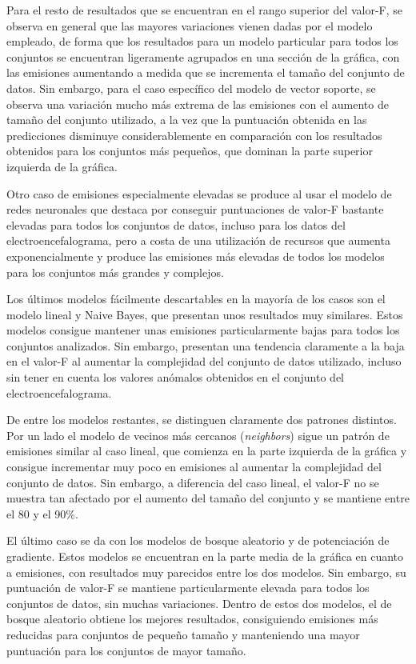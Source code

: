 Para el resto de resultados que se encuentran en el rango superior del valor-F, se observa en general que las mayores variaciones vienen dadas por el modelo empleado, de forma que los resultados para un modelo particular para todos los conjuntos se encuentran ligeramente agrupados en una sección de la gráfica, con las emisiones aumentando a medida que se incrementa el tamaño del conjunto de datos. Sin embargo, para el caso específico del modelo de vector soporte, se observa una variación mucho más extrema de las emisiones con el aumento de tamaño del conjunto utilizado, a la vez que la puntuación obtenida en las predicciones disminuye considerablemente en comparación con los resultados obtenidos para los conjuntos más pequeños, que dominan la parte superior izquierda de la gráfica.

Otro caso de emisiones especialmente elevadas se produce al usar el modelo de redes neuronales que destaca por conseguir puntuaciones de valor-F bastante elevadas para todos los conjuntos de datos, incluso para los datos del electroencefalograma, pero a costa de una utilización de recursos que aumenta exponencialmente y produce las emisiones más elevadas de todos los modelos para los conjuntos más grandes y complejos.

Los últimos modelos fácilmente descartables en la mayoría de los casos son el modelo lineal y Naive Bayes, que presentan unos resultados muy similares. Estos modelos consigue mantener unas emisiones particularmente bajas para todos los conjuntos analizados. Sin embargo, presentan una tendencia claramente a la baja en el valor-F al aumentar la complejidad del conjunto de datos utilizado, incluso sin tener en cuenta los valores anómalos obtenidos en el conjunto del electroencefalograma.

De entre los modelos restantes, se distinguen claramente dos patrones distintos. Por un lado el modelo de vecinos más cercanos (\emph{neighbors}) sigue un patrón de emisiones similar al caso lineal, que comienza en la parte izquierda de la gráfica y consigue incrementar muy poco en emisiones al aumentar la complejidad del conjunto de datos. Sin embargo, a diferencia del caso lineal, el valor-F no se muestra tan afectado por el aumento del tamaño del conjunto y se mantiene entre el 80 y el 90\%.

El último caso se da con los modelos de bosque aleatorio y de potenciación de gradiente. Estos modelos se encuentran en la parte media de la gráfica en cuanto a emisiones, con resultados muy parecidos entre los dos modelos. Sin embargo, su puntuación de valor-F se mantiene particularmente elevada para todos los conjuntos de datos, sin muchas variaciones. Dentro de estos dos modelos, el de bosque aleatorio obtiene los mejores resultados, consiguiendo emisiones más reducidas para conjuntos de pequeño tamaño y manteniendo una mayor puntuación para los conjuntos de mayor tamaño.


